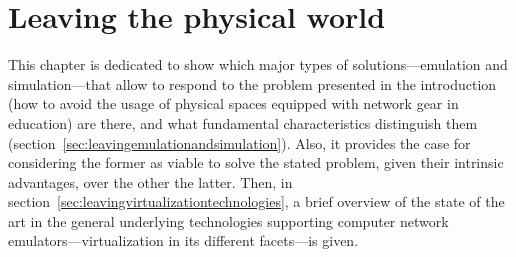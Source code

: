 
\chapter{Leaving the physical world}
\label{ch:leavingthephysicalworld}

This chapter is dedicated to show which major types of solutions---emulation and simulation---that allow to respond to the problem presented in the introduction (how to avoid the usage of physical spaces equipped with network gear in education) are there, and what fundamental characteristics distinguish them (section~\ref{sec:leavingemulationandsimulation}).
Also, it provides the case for considering the former as viable to solve the stated problem, given their intrinsic advantages, over the other the latter.
Then, in section~\ref{sec:leavingvirtualizationtechnologies}, a brief overview of the state of the art in the general underlying technologies supporting computer network emulators---virtualization in its different facets---is given.









